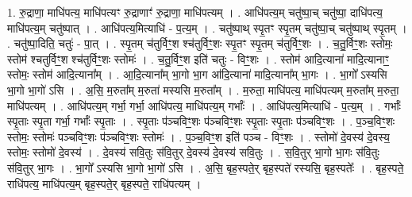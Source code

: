 \documentclass[17pt]{extarticle}
\begin{document}
1. रु॒द्राणा॒ माधि॑पत्य॒ माधि॑पत्यꣳ रु॒द्राणाꣳ॑ रु॒द्राणा॒ माधि॑पत्यम् । . आधि॑पत्य॒म् चतु॑ष्पा॒च् चतु॑ष्पा॒ दाधि॑पत्य॒ माधि॑पत्य॒म् चतु॑ष्पात् । . आधि॑पत्य॒मित्याधि॑ - प॒त्य॒म् । . चतु॑ष्पाथ् स्पृ॒तꣳ स्पृ॒तम् चतु॑ष्पा॒च् चतु॑ष्पाथ् स्पृ॒तम् । . चतु॑ष्पा॒दिति॒ चतुः॑ - पा॒त् । . स्पृ॒तम् च॑तुर्विꣳ॒॒श श्च॑तुर्विꣳ॒॒शः स्पृ॒तꣳ स्पृ॒तम् च॑तुर्विꣳ॒॒शः । . च॒तु॒र्विꣳ॒॒शः स्तोमः॒ स्तोम॑ श्चतुर्विꣳ॒॒श श्च॑तुर्विꣳ॒॒शः स्तोमः॑ । . च॒तु॒र्विꣳ॒॒श इति॑ चतुः - विꣳ॒॒शः । . स्तोम॑ आदि॒त्याना॑ मादि॒त्यानाꣳ॒॒ स्तोमः॒ स्तोम॑ आदि॒त्याना᳚म् । . आ॒दि॒त्याना᳚म् भा॒गो भा॒ग आ॑दि॒त्याना॑ मादि॒त्याना᳚म् भा॒गः । . भा॒गो᳚ ऽस्यसि भा॒गो भा॒गो॑ ऽसि । . अ॒सि॒ म॒रुता᳚म् म॒रुता॑ मस्यसि म॒रुता᳚म् । . म॒रुता॒ माधि॑पत्य॒ माधि॑पत्यम् म॒रुता᳚म् म॒रुता॒ माधि॑पत्यम् । . आधि॑पत्य॒म् गर्भा॒ गर्भा॒ आधि॑पत्य॒ माधि॑पत्य॒म् गर्भाः᳚ । . आधि॑पत्य॒मित्याधि॑ - प॒त्य॒म् । . गर्भाः᳚ स्पृ॒ताः स्पृ॒ता गर्भा॒ गर्भाः᳚ स्पृ॒ताः । . स्पृ॒ताः प॑ञ्चविꣳ॒॒शः प॑ञ्चविꣳ॒॒शः स्पृ॒ताः स्पृ॒ताः प॑ञ्चविꣳ॒॒शः । . प॒ञ्च॒विꣳ॒॒शः स्तोमः॒ स्तोमः॑ पञ्चविꣳ॒॒शः प॑ञ्चविꣳ॒॒शः स्तोमः॑ । . प॒ञ्च॒विꣳ॒॒श इति॑ पञ्च - विꣳ॒॒शः । . स्तोमो॑ दे॒वस्य॑ दे॒वस्य॒ स्तोमः॒ स्तोमो॑ दे॒वस्य॑ । . दे॒वस्य॑ सवि॒तुः स॑वि॒तुर् दे॒वस्य॑ दे॒वस्य॑ सवि॒तुः । . स॒वि॒तुर् भा॒गो भा॒गः स॑वि॒तुः स॑वि॒तुर् भा॒गः । . भा॒गो᳚ ऽस्यसि भा॒गो भा॒गो॑ ऽसि । . अ॒सि॒ बृह॒स्पते॒र् बृह॒स्पते॑ रस्यसि॒ बृह॒स्पतेः᳚ । . बृह॒स्पते॒ राधि॑पत्य॒ माधि॑पत्य॒म् बृह॒स्पते॒र् बृह॒स्पते॒ राधि॑पत्यम् । \newline
\end{document}
